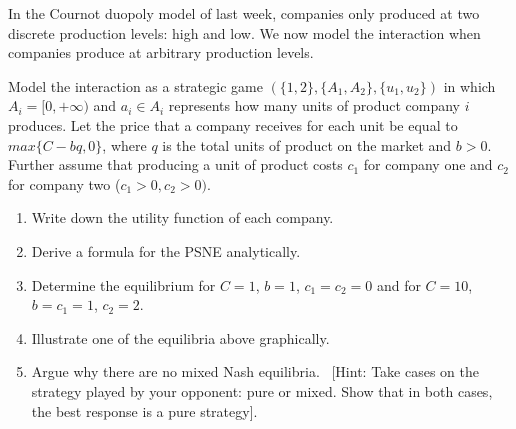 \documentclass[../main.tex]{subfiles}
\begin{document}
\begin{question}
	In the Cournot duopoly model of last week, companies only produced at two discrete production levels: high and low. We now model the interaction when companies produce at arbitrary production levels.

	Model the interaction as a strategic game $(\{1,2\},\{A_1,A_2\},\{u_1,u_2\})$ in which $A_i = [0, +\infty)$ and $a_i \in A_i$ represents how many units of product company $i$ produces. Let the price that a company receives for each unit be equal to $max\{C - bq, 0\}$, where $q$ is the total units of product on the market and $b > 0$. Further assume that producing a unit of product costs $c_1$ for company one and $c_2$ for company two ($c_1 > 0, c_2 > 0)$.

	\begin{enumerate}
	\item Write down the utility function of each company.
	\item Derive a formula for the PSNE analytically.
	\item Determine the equilibrium for $C = 1$, $b = 1$, $c_1 = c_2 = 0$ and for $C = 10$, $b = c_1 = 1$, $c_2 = 2$.
	\item Illustrate one of the equilibria above graphically.
	\item Argue why there are no mixed Nash equilibria. \
	[Hint: Take cases on the strategy played by your opponent: pure or mixed. Show that in both cases, the best response is a pure strategy].
	\end{enumerate}
\end{question}
\end{document}

